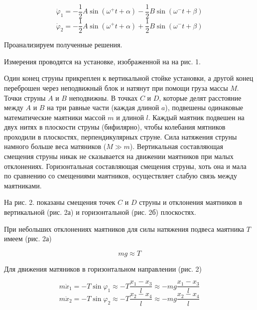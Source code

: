 \documentclass[14pt]{article}
\begin{document}
\begin{equation}
\dot \varphi_1 = -\frac{1}{2}A\sin(\omega^+t + \alpha) - \frac{1}{2}B\sin(\omega^-t + \beta)
\end{equation}
\begin{equation}
\dot \varphi_2 = -\frac{1}{2}A\sin(\omega^+t + \alpha) + \frac{1}{2}B\sin(\omega^-t + \beta)
\end{equation}

Проанализируем полученные решения.


%
%
%
%
%
%
%
%
%
%
%
%
%
%










\setcounter{equation}{0}

%
%

Измерения проводятся на установке, изображенной на на рис. 1.

Один конец струны прикреплен к вертикальной стойке установки, а другой конец переброшен через неподвижный блок и натянут при помощи груза массы 
$M$. Точки струны $A$ и $B$ неподвижны. В точках $C$ и $D$, которые делят расстояние между $A$ и $B$ на три равные части (каждая длиной $a$), подвешены одинаковые математические маятники массой $m$ и длиной $l$. Каждый маятник подвешен на двух нитях в плоскости струны (бифилярно), чтобы колебания мятников проходили в плоскостях, перпендикулярных струне. Сила натяжения струны намного больше веса матяников ($M \gg m$). Вертикальная составляющая смещения струны никак не сказывается на движении маятников при малых отклонениях. Горизонтальная составляющая смещения струны, хоть она и мала по сравнению со смещениями маятников, осуществляет слабую связь между маятниками.

На рис. 2. показаны смещения точек $C$ и $D$ струны и отклонения маятников в вертикальной (рис. 2а) и горизонтальной (рис. 2б) плоскостях. 

При небольших отклонениях маятников для силы натяжения подвеса маятника $T$ имеем (рис. 2а)

\begin{equation}
mg \approx T
\end{equation}

Для движения матяников в горизонтальном направлении (рис. 2)

\begin{equation}
m\ddot x_1 = -T\sin\varphi_1 \approx -T\frac{x_1 - x_3}{l} \approx -mg\frac{x_1 - x_3}{l}
\end{equation}
\begin{equation}
m\ddot x_2 = -T\sin\varphi_2 \approx -T\frac{x_2 - x_4}{l} \approx -mg\frac{x_2 - x_4}{l}
\end{equation}
\end{document}
